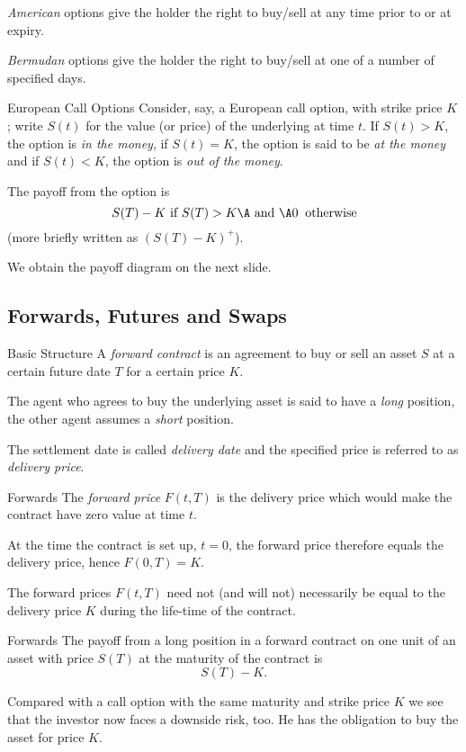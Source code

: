 	{\it American} options give the holder the right to buy/sell at any time
	prior to or at expiry.
	
	\emph{Bermudan} options give the holder the right to buy/sell at one of a
	number of specified days.


European Call Options
	Consider, say, a European call option, with strike price $K$;
	write $S(t)$ for the value (or price) of the underlying at time
	$t$.  If $S(t) > K$, the option is {\it in the money}, if $S(t) =
	K$, the option is said to be {\it at the money} and if $S(t) < K$,
	the option is {\it out of the money}.
 
	The payoff from the option is $$ S(T) - K \mbox{ if } S(T)
	> K\A \mbox{ and }\A 0 \;\; \mbox{otherwise} $$ (more briefly
	written as  $(S(T) - K)^+$).
 
	We obtain the payoff diagram on the next slide. 


\subsection{Forwards, Futures and Swaps}

Basic Structure
	A {\it forward contract}
	is an agreement to buy or sell an asset $S$ at a certain future
	date $T$ for a certain price $K$.

	The agent who agrees to buy the underlying asset is said to have a {\it long}
	position, the other agent assumes a {\it short} position.
 
	The settlement date is called {\it delivery date} and the specified
	price is referred to as {\it delivery price}.


Forwards
	The {\it forward price} $F(t,T)$ is the delivery price which would make the
	contract have zero value at time $t$.
	
	At the time the contract is set up, $t=0$, the forward price therefore 
	equals the delivery price, hence $F(0,T) = K$.

	The forward prices $F(t,T)$ need not (and will not)
	necessarily be equal to the delivery price $K$ during the
	life-time of the contract.


Forwards
	The payoff from a long position in a forward contract on one unit
	of an asset with price $S(T)$ at the maturity of the contract is
	$$ S(T)-K.$$
	
	Compared with a call option with the same maturity
	and strike price $K$ we see that the investor now faces a downside
	risk, too. He has the obligation to buy the asset for price $K$.


